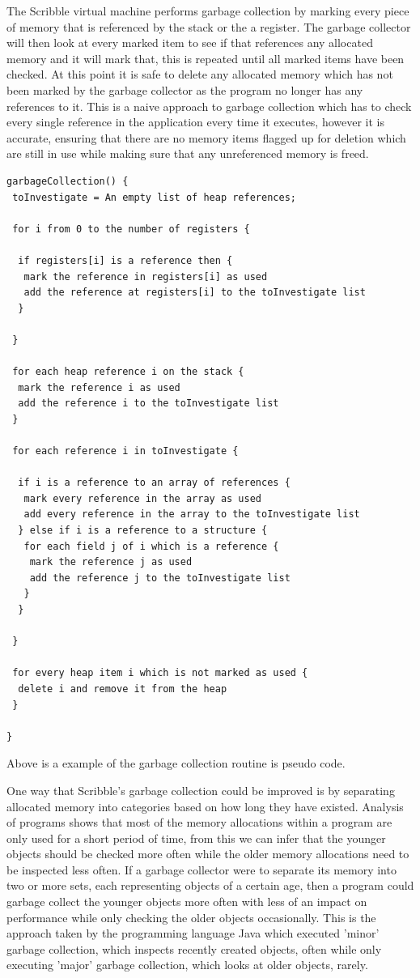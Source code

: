 \documentclass[]{final_report}
\begin{document}
The Scribble virtual machine performs garbage collection by marking every piece of memory that is referenced by the stack or the a register. The garbage collector will then look at every marked item to see if that references any allocated memory and it will mark that, this is repeated until all marked items have been checked. At this point it is safe to delete any allocated memory which has not been marked by the garbage collector as the program no longer has any references to it. This is a naive approach to garbage collection which has to check every single reference in the application every time it executes, however it is accurate, ensuring that there are no memory items flagged up for deletion which are still in use while making sure that any unreferenced memory is freed.

\begin{verbatim}
garbageCollection() {
 toInvestigate = An empty list of heap references;

 for i from 0 to the number of registers {

  if registers[i] is a reference then {
   mark the reference in registers[i] as used
   add the reference at registers[i] to the toInvestigate list
  }

 }
	
 for each heap reference i on the stack {
  mark the reference i as used
  add the reference i to the toInvestigate list
 }
	
 for each reference i in toInvestigate {

  if i is a reference to an array of references {
   mark every reference in the array as used
   add every reference in the array to the toInvestigate list		
  } else if i is a reference to a structure {
   for each field j of i which is a reference {
    mark the reference j as used
    add the reference j to the toInvestigate list
   }
  }
  
 }

 for every heap item i which is not marked as used {
  delete i and remove it from the heap
 }

}
\end{verbatim}

Above is a example of the garbage collection routine is pseudo code.

One way that Scribble's garbage collection could be improved is by separating allocated memory into categories based on how long they have existed. Analysis of programs shows that most of the memory allocations within a program are only used for a short period of time, from this we can infer that the younger objects should be checked more often while the older memory allocations need to be inspected less often. If a garbage collector were to separate its memory into two or more sets, each representing objects of a certain age, then a program could garbage collect the younger objects more often with less of an impact on performance while only checking the older objects occasionally. This is the approach taken by the programming language Java which executed 'minor' garbage collection, which inspects recently created objects, often while only executing 'major' garbage collection, which looks at older objects, rarely\cite{JVMGC}.
\end{document}
